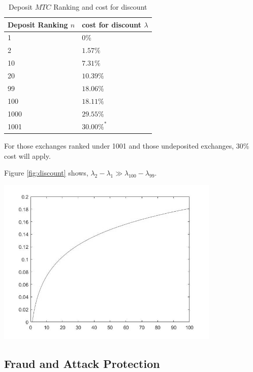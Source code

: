 \documentclass[UTF8,nofonts]{article}
\makeatletter
\newenvironment{figurehere}
 {\def\@captype{figure}}
 {}
\makeatother
\begin{document}
\begin{table}[hbt]
 \centering
\begin{tabular}{p{3.5cm}|p{3cm}} %
Deposit Ranking $n$ & cost for discount $\lambda$ \\ %
  \hline
1 & 0\%\\
\hline
2 & $1.57\%$\\
\hline
10 & $7.31\%$\\
\hline
20 & $10.39\%$\\
\hline
99 &$18.06\%$\\
\hline
100 &$18.11\%$\\
\hline
1000 &$29.55\%$\\
\hline
1001 &$30.00\%^*$\\
 \end{tabular}
\caption{Deposit $MTC$ Ranking and cost for discount} %
\end{table}


For those exchanges ranked under 1001 and those undeposited exchanges, 30\% cost will apply.

Figure \ref{fig:discount} shows, $\lambda_{2} - \lambda_{1} \gg \lambda_{100} - \lambda_{99}$.

\begin{center}
\begin{figurehere}
\includegraphics[height=8cm]{images/exchange-discount.png}

\caption{$MTC$ token deposit rank and cost for discount}
\label{fig:discount}

\end{figurehere}
\end{center}


\subsection{Fraud and Attack Protection}
\end{document}
